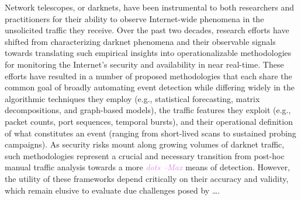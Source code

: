 \documentclass[manuscript,nonacm]{acmart}
\newcommand{\maxnote}[1]{\textit{\textcolor{violet}{#1 --Max}}}
\begin{document}
Network telescopes, or darknets, have been instrumental to both researchers and practitioners for their ability to observe Internet-wide phenomena in the unsolicited traffic they receive. 
Over the past two decades, research efforts have shifted from characterizing darknet phenomena and their observable signals towards translating such empirical insights into operationalizable methodologies for monitoring the Internet's security and availability in near real-time.
These efforts have resulted in a number of proposed methodologies that each share the common goal of broadly automating event detection while differing widely in the algorithmic techniques they employ (e.g., statistical forecasting, matrix decompositions, and graph-based models), 
the traffic features they exploit (e.g., packet counts, port sequences, temporal bursts), 
and their operational definition of what constitutes an event (ranging from short-lived scans to sustained probing campaigns).
As security risks mount along growing volumes of darknet traffic, such methodologies represent a crucial and necessary transition from post-hoc manual traffic analysis towards a more \maxnote{dots} means of detection.
However, the utility of these frameworks depend critically on their accuracy and validity, which remain elusive to evaluate due challenges posed by \dots.


\end{document}
